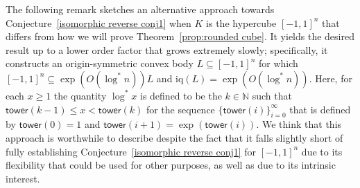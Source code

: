 \documentclass[11pt,reqno]{amsart}
\renewcommand{\le}{\leqslant}
\renewcommand{\ge}{\geqslant}
\theoremstyle{remark}
\newcommand{\iq}{\mathrm{iq}}
\renewcommand{\subset}{\subseteq}
\newcommand{\N}{\mathbb N}
\renewcommand{\1}{\mathbf 1}
\begin{document}
The following remark sketches an alternative approach towards  Conjecture~\ref{isomorphic reverse conj1}  when $K$ is the hypercube  $[-1,1]^n$ that differs from how we will prove Theorem~\ref{prop:rounded cube}. It  yields the desired result up to a lower order factor that grows extremely slowly; specifically, it constructs an origin-symmetric convex body $L\subset [-1,1]^n$ for which $[-1,1]^n\subset \exp(O(\log^*\!\! n)) L$ and $\iq(L)= \exp(O(\log^*\!\! n))$. Here, for each  $x\ge 1$ the quantity $\log^*\!\! x$ is defined to be the  $k\in \N$ such that $\mathsf{tower}(k-1)\le x< \mathsf{tower}(k)$ for the  sequence $\{\mathsf{tower}(i)\}_{i=0}^\infty$ that is defined  by $\mathsf{tower}(0)=1$ and $\mathsf{tower}(i+1)=\exp(\mathsf{tower}(i))$. We think that this approach is worthwhile to describe despite the fact that it falls slightly short of fully establishing  Conjecture~\ref{isomorphic reverse conj1} for $[-1,1]^n$ due to its flexibility that could be used for other purposes, as well as due to its intrinsic interest.
\end{document}
